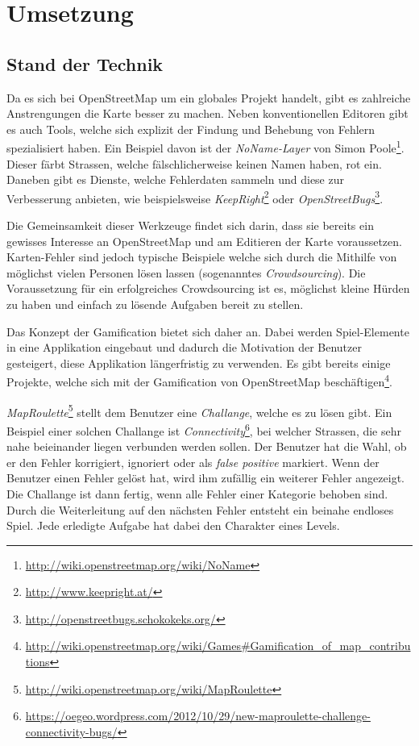 \chapter{Umsetzung}
\label{umsetzung}

\section{Stand der Technik}
Da es sich bei \gls{OpenStreetMap} um ein globales Projekt handelt, gibt es zahlreiche Anstrengungen die Karte besser zu machen.
Neben konventionellen Editoren gibt es auch Tools, welche sich explizit der Findung und Behebung von Fehlern spezialisiert haben.
Ein Beispiel davon ist der \emph{NoName-Layer} von Simon Poole\footnote{\url{http://wiki.openstreetmap.org/wiki/NoName}}. Dieser färbt Strassen, welche fälschlicherweise keinen Namen haben, rot ein.
Daneben gibt es Dienste, welche Fehlerdaten sammeln und diese zur Verbesserung anbieten, wie beispielsweise \emph{KeepRight}\footnote{\url{http://www.keepright.at/}} oder \emph{OpenStreetBugs}\footnote{\url{http://openstreetbugs.schokokeks.org/}}.

Die Gemeinsamkeit dieser Werkzeuge findet sich darin, dass sie bereits ein gewisses Interesse an \gls{OpenStreetMap} und am Editieren der Karte voraussetzen.
Karten-Fehler sind jedoch typische Beispiele welche sich durch die Mithilfe von möglichst vielen Personen lösen lassen (sogenanntes \emph{Crowdsourcing}).
Die Voraussetzung für ein erfolgreiches Crowdsourcing ist es, möglichst kleine Hürden zu haben und einfach zu lösende Aufgaben bereit zu stellen.

Das Konzept der \gls{Gamification} bietet sich daher an.
Dabei werden Spiel-Elemente in eine Applikation eingebaut und dadurch die Motivation der Benutzer gesteigert, diese Applikation längerfristig zu verwenden.
Es gibt bereits einige Projekte, welche sich mit der \gls{Gamification} von \gls{OpenStreetMap} beschäftigen\footnote{\url{http://wiki.openstreetmap.org/wiki/Games\#Gamification_of_map_contributions}}.

\emph{MapRoulette}\footnote{\url{http://wiki.openstreetmap.org/wiki/MapRoulette}} stellt dem Benutzer eine \emph{Challange}, welche es zu lösen gibt.
Ein Beispiel einer solchen Challange ist \emph{Connectivity}\footnote{\url{https://oegeo.wordpress.com/2012/10/29/new-maproulette-challenge-connectivity-bugs/}}, bei welcher Strassen, die sehr nahe beieinander liegen verbunden werden sollen.
Der Benutzer hat die Wahl, ob er den Fehler korrigiert, ignoriert oder als \emph{false positive} markiert.
Wenn der Benutzer einen Fehler gelöst hat, wird ihm zufällig ein weiterer Fehler angezeigt.
Die Challange ist dann fertig, wenn alle Fehler einer Kategorie behoben sind.
Durch die Weiterleitung auf den nächsten Fehler entsteht ein beinahe endloses Spiel. Jede erledigte Aufgabe hat dabei den Charakter eines Levels.

